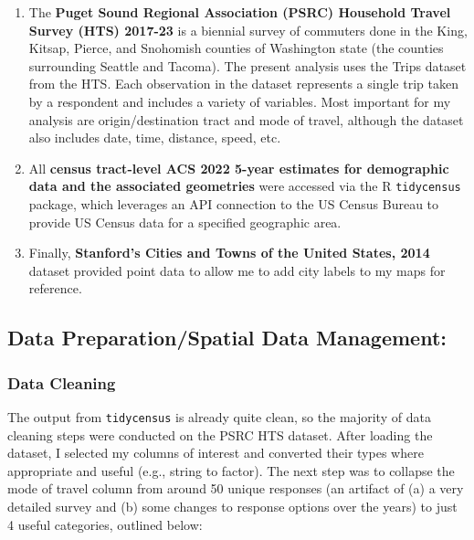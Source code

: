 \documentclass[
]{article}
\providecommand{\tightlist}{%
  \setlength{\itemsep}{0pt}\setlength{\parskip}{0pt}}
\begin{document}
\begin{enumerate}
\def\labelenumi{\arabic{enumi}.}
\tightlist
\item
  The \textbf{Puget Sound Regional Association (PSRC) Household Travel
  Survey (HTS) 2017-23} is a biennial survey of commuters done in the
  King, Kitsap, Pierce, and Snohomish counties of Washington state (the
  counties surrounding Seattle and Tacoma). The present analysis uses
  the Trips dataset from the HTS. Each observation in the dataset
  represents a single trip taken by a respondent and includes a variety
  of variables. Most important for my analysis are origin/destination
  tract and mode of travel, although the dataset also includes date,
  time, distance, speed, etc.
\item
  All \textbf{census tract-level ACS 2022 5-year estimates for
  demographic data and the associated geometries} were accessed via the
  R \texttt{tidycensus} package, which leverages an API connection to
  the US Census Bureau to provide US Census data for a specified
  geographic area.
\item
  Finally, \textbf{Stanford's Cities and Towns of the United States,
  2014} dataset provided point data to allow me to add city labels to my
  maps for reference.
\end{enumerate}

\subsection{Data Preparation/Spatial Data
Management:}\label{data-preparationspatial-data-management}

\subsubsection{Data Cleaning}\label{data-cleaning}

The output from \texttt{tidycensus} is already quite clean, so the
majority of data cleaning steps were conducted on the PSRC HTS dataset.
After loading the dataset, I selected my columns of interest and
converted their types where appropriate and useful (e.g., string to
factor). The next step was to collapse the mode of travel column from
around 50 unique responses (an artifact of (a) a very detailed survey
and (b) some changes to response options over the years) to just 4
useful categories, outlined below:
\end{document}
